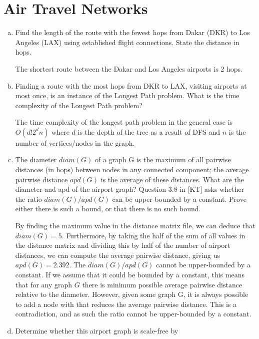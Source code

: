 \documentclass[12pt]{article}
\begin{document}
\section{Air Travel Networks}\label{air travel networks}
\begin{enumerate}[(a)]
\item Find the length of the route with the fewest hops from Dakar (DKR) to Los Angeles (LAX) using established flight connections. State the distance in hops.
\begin{addmargin}[2em]{2em}
The shortest route between the Dakar and Los Angeles airports is 2 hops.
\end{addmargin}
\item Finding a route with the most hops from DKR to LAX, visiting airports at most once, is an instance of the Longest Path problem. What is the time complexity of the Longest Path problem?
\begin{addmargin}[2em]{2em}
The time complexity of the longest path problem in the general case is $O(d!2^dn)$ where $d$ is the depth of the tree as a result of DFS and $n$ is the number of vertices/nodes in the graph.
\end{addmargin}
\item The diameter $diam(G)$ of a graph G is the maximum of all pairwise distances (in hops) between nodes in any connected component; the average pairwise distance $apd(G)$ is the average of these distances. What are the diameter and apd of the airport graph? Question 3.8 in [KT] asks whether the ratio $diam(G)/apd(G)$ can be upper-bounded by a constant. Prove either there is such a bound, or that there is no such bound.
\begin{addmargin}[2em]{2em}
By finding the maximum value in the distance matrix file, we can deduce that $diam(G) = 5$. Furthermore, by taking the half of the sum of all values in the distance matrix and dividing this by half of the number of airport distances, we can compute the average pairwise distance, giving us $apd(G) = 2.392$. The $diam(G)/apd(G)$ cannot be upper-bounded by a constant. If we assume that it could be bounded by a constant, this means that for any graph $G$ there is minimum possible average pairwise distance relative to the diameter. However, given some graph G, it is always possible to add a node with that reduces the average pairwise distance. This is a contradiction, and as such the ratio cannot be upper-bounded by a constant.
\end{addmargin}
\item Determine whether this airport graph is scale-free by

\end{enumerate}
\end{document}
